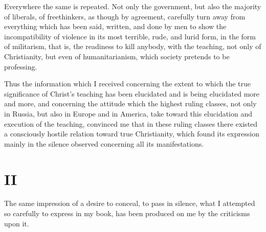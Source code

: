 \documentclass{book}
\begin{document}
Everywhere the same is repeated. Not only the government, but also the majority of liberals, of freethinkers, as though by agreement, carefully turn away from everything which has been said, written, and done by men to show the incompatibility of violence in its most terrible, rude, and lurid form, in the form of militarism, that is, the readiness to kill anybody, with the teaching, not only of Christianity, but even of humanitarianism, which society pretends to be professing.

Thus the information which I received concerning the extent to which the true significance of Christ’s teaching has been elucidated and is being elucidated more and more, and concerning the attitude which the highest ruling classes, not only in Russia, but also in Europe and in America, take toward this elucidation and execution of the teaching, convinced me that in these ruling classes there existed a consciously hostile relation toward true Christianity, which found its expression mainly in the silence observed concerning all its manifestations.

\chapter*{II}
\label{chapter-2}
The same impression of a desire to conceal, to pass in silence, what I attempted so carefully to express in my book, has been produced on me by the criticisms upon it.
\end{document}
